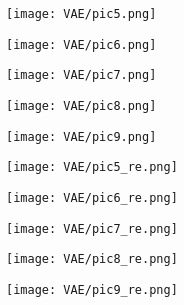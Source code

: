 \begin{figure}[t]
    \subfigure
    {
        \begin{minipage}{0.12\linewidth}
        \texttt{[image: VAE/pic5.png]}
        \end{minipage}
    }
    \subfigure
    {
        \begin{minipage}{0.12\linewidth}
        \texttt{[image: VAE/pic6.png]}
        \end{minipage}
    }
    \subfigure
    {
        \begin{minipage}{0.12\linewidth}
        \texttt{[image: VAE/pic7.png]}
        \end{minipage}
    }
    \subfigure
    {
        \begin{minipage}{0.12\linewidth}
        \texttt{[image: VAE/pic8.png]}
        \end{minipage}
    }
    \subfigure
    {
        \begin{minipage}{0.12\linewidth}
        \texttt{[image: VAE/pic9.png]}
        \end{minipage}
    }
    \subfigure
    {
        \begin{minipage}{0.12\linewidth}
        \texttt{[image: VAE/pic5\_re.png]}
        \end{minipage}
    }
    \subfigure
    {
        \begin{minipage}{0.12\linewidth}
        \texttt{[image: VAE/pic6\_re.png]}
        \end{minipage}
    }
    \subfigure
    {
        \begin{minipage}{0.12\linewidth}
        \texttt{[image: VAE/pic7\_re.png]}
        \end{minipage}
    }
    \subfigure
    {
        \begin{minipage}{0.12\linewidth}
        \texttt{[image: VAE/pic8\_re.png]}
        \end{minipage}
    }
    \subfigure
    {
        \begin{minipage}{0.12\linewidth}
        \texttt{[image: VAE/pic9\_re.png]}
        \end{minipage}
    }
    
    \vspace{1mm}
    \hrulefill
    \vspace{1mm}
    

\end{figure}
